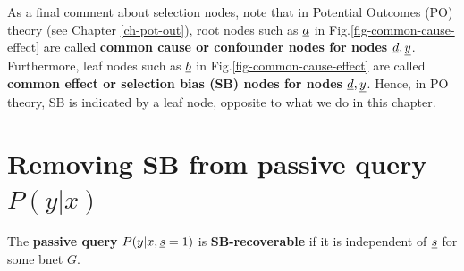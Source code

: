 As a final
comment about
selection nodes,
note
that in Potential
Outcomes (PO) theory
 (see Chapter \ref{ch-pot-out}),
root nodes such
as ${\underline{a}}$ in
Fig.\ref{fig-common-cause-effect}
are called {\bf common cause
 or confounder nodes
for nodes ${\underline{d}}, {\underline{y}}$}.
Furthermore, leaf nodes such as 
${\underline{b}}$ in
Fig.\ref{fig-common-cause-effect} are 
called 
{\bf common effect
or selection bias (SB) nodes
for nodes ${\underline{d}}, {\underline{y}}$}.
Hence, in PO theory,
SB is indicated
by
a leaf node,
opposite to 
what we do in this chapter.












\section{Removing SB from 
passive query $P(y|x)$}

The {\bf  passive query} $P(y|x, {\underline{s}}=1)$
is {\bf SB-recoverable}
if it is independent of ${\underline{s}}$
for some bnet $G$.

